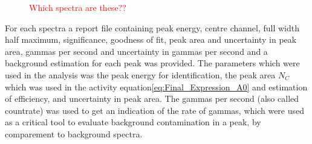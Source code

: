 \begin{figure}%
    \centering
    \quad
    \caption{\textcolor{red}{Which spectra are these??  }}%
    \label{fig:193mPt_spectra}%
\end{figure}


\noindent For each spectra a report file containing peak energy, centre channel, full width half maximum, significance, goodness of fit, peak area and uncertainty in peak area, gammas per second and uncertainty in gammas per second and a background estimation for each peak was provided. The parameters which were used in the analysis was the peak energy for identification, the peak area $N_C$ which was used in the activity equation\ref{eq:Final_Expression_A0} and estimation of efficiency, and uncertainty in peak area. The gammas per second (also called countrate) was used to get an indication of the rate of gammas, which were used as a critical tool to evaluate background contamination in a peak, by comparement to background spectra.  \\ 

